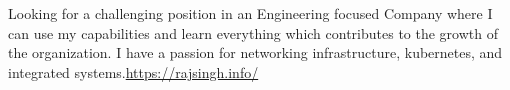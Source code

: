\documentclass[letter,10pt]{article}
\begin{document}


Looking for a challenging position in an Engineering focused Company where I can use my capabilities and learn everything which contributes to the growth of the organization. I have a passion for networking infrastructure, kubernetes, and integrated systems.\href{https://rajsingh.info/}{https://rajsingh.info/}
\end{document}
